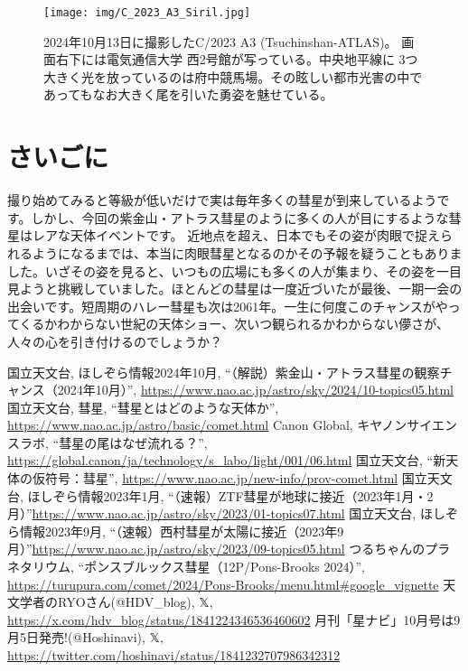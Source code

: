 \documentclass{supernova_pre}
\begin{document}
\begin{figure}
  \centering
  \texttt{[image: img/C\_2023\_A3\_Siril.jpg]}
  \caption{2024年10月13日に撮影したC/2023 A3 (Tsuchinshan-ATLAS)。 画面右下には電気通信大学 西2号館が写っている。中央地平線に
  3つ大きく光を放っているのは府中競馬場。その眩しい都市光害の中であってもなお大きく尾を引いた勇姿を魅せている。}
  \label{fig:Tsuchinshan-ATLAS}
\end{figure}

\clearpage
\section{さいごに}

撮り始めてみると等級が低いだけで実は毎年多くの彗星が到来しているようです。しかし、今回の紫金山・アトラス彗星のように多くの人が目にするような彗星はレアな天体イベントです。
近地点を超え、日本でもその姿が肉眼で捉えられるようになるまでは、本当に肉眼彗星となるのかその予報を疑うこともありました。いざその姿を見ると、いつもの広場にも多くの人が集まり、その姿を一目見ようと挑戦していました。ほとんどの彗星は一度近づいたが最後、一期一会の出会いです。短周期のハレー彗星も次は2061年。一生に何度このチャンスがやってくるかわからない世紀の天体ショー、次いつ観られるかわからない儚さが、人々の心を引き付けるのでしょうか？



\begin{thebibliography}{9}
     国立天文台, ほしぞら情報2024年10月, ``（解説）紫金山・アトラス彗星の観察チャンス（2024年10月）'', \url{https://www.nao.ac.jp/astro/sky/2024/10-topics05.html}
     国立天文台, 彗星, ``彗星とはどのような天体か'', \url{https://www.nao.ac.jp/astro/basic/comet.html}
     Canon Global, キヤノンサイエンスラボ, ``彗星の尾はなぜ流れる？'', \url{https://global.canon/ja/technology/s_labo/light/001/06.html}
     国立天文台, ``新天体の仮符号：彗星'', \url{https://www.nao.ac.jp/new-info/prov-comet.html}
     国立天文台, ほしぞら情報2023年1月, ``（速報）ZTF彗星が地球に接近（2023年1月・2月）''\url{https://www.nao.ac.jp/astro/sky/2023/01-topics07.html}
     国立天文台, ほしぞら情報2023年9月, ``（速報）西村彗星が太陽に接近（2023年9月）''\url{https://www.nao.ac.jp/astro/sky/2023/09-topics05.html}
     つるちゃんのプラネタリウム, ``ポンスブルックス彗星（12P/Pons-Brooks 2024）'', \url{https://turupura.com/comet/2024/Pons-Brooks/menu.html#google_vignette}
     天文学者のRYOさん(@HDV\_blog), 𝕏, \url{https://x.com/hdv_blog/status/1841224346536460602}
     月刊「星ナビ」10月号は9月5日発売!(@Hoshinavi), 𝕏, \url{https://twitter.com/hoshinavi/status/1841232707986342312}
\end{thebibliography}
\end{document}
